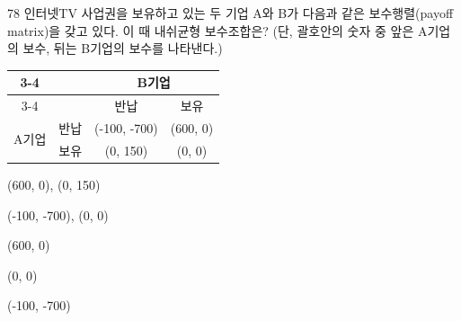 \begin{question}{78}
인터넷TV 사업권을 보유하고 있는 두 기업 A와 B가 다음과 같은 보수행렬(payoff matrix)을 갖고 있다. 이 때 내쉬균형 보수조합은? (단, 괄호안의 숫자 중 앞은 A기업의 보수, 뒤는 B기업의 보수를 나타낸다.)

{\small\centering
\begin{tabular}{cc|c|c|}
\cline{3-4}
 & & \multicolumn{2}{c|}{B기업} \\
\cline{3-4}
 & & 반납 & 보유 \\
\hline
\multicolumn{1}{|c|}{\multirow{2}{*}{A기업}} & 반납 & (-100, -700) & (600, 0) \\
\cline{2-4}
\multicolumn{1}{|c|}{} & 보유 & (0, 150) & (0, 0) \\
\hline
\end{tabular}\par}

\begin{choices}
  \item (600, 0), (0, 150)
  \item (-100, -700), (0, 0)
  \item (600, 0)
  \item (0, 0)
  \item (-100, -700)
\end{choices}
\end{question}
